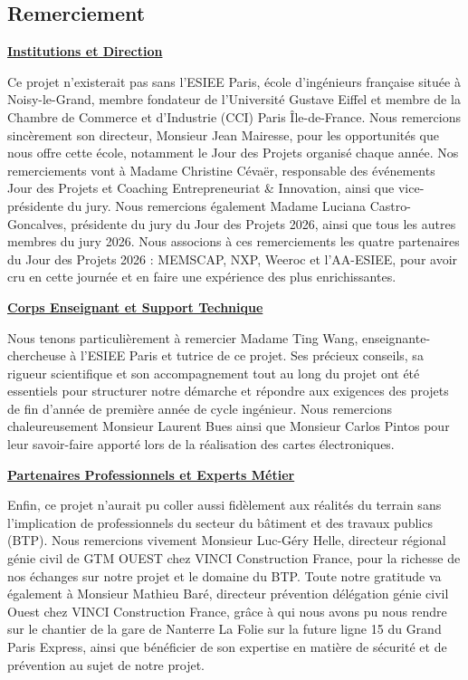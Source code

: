 \subsection{Remerciement}

\uline{\textbf{Institutions et Direction}}

Ce projet n'existerait pas sans l'ESIEE Paris, école d'ingénieurs française située à Noisy-le-Grand, membre fondateur de l'Université Gustave Eiffel et membre de la Chambre de Commerce et d'Industrie (CCI) Paris Île-de-France. Nous remercions sincèrement son directeur, Monsieur Jean Mairesse, pour les opportunités que nous offre cette école, notamment le Jour des Projets organisé chaque année.
Nos remerciements vont à Madame Christine Cévaër, responsable des événements Jour des Projets et Coaching Entrepreneuriat \& Innovation, ainsi que vice-présidente du jury. 
Nous remercions également Madame Luciana Castro-Goncalves, présidente du jury du Jour des Projets 2026, ainsi que tous les autres membres du jury 2026. 
Nous associons à ces remerciements les quatre partenaires du Jour des Projets 2026 : MEMSCAP, NXP, Weeroc et l'AA-ESIEE, pour avoir cru en cette journée et en faire une expérience des plus enrichissantes.

\bigskip

\uline{\textbf{Corps Enseignant et Support Technique}}

Nous tenons particulièrement à remercier Madame Ting Wang, enseignante-chercheuse à l'ESIEE Paris et tutrice de ce projet. Ses précieux conseils, sa rigueur scientifique et son accompagnement tout au long du projet ont été essentiels pour structurer notre démarche et répondre aux exigences des projets de fin d'année de première année de cycle ingénieur.
Nous remercions chaleureusement Monsieur Laurent Bues ainsi que Monsieur Carlos Pintos pour leur savoir-faire apporté lors de la réalisation des cartes électroniques.

\bigskip

\uline{\textbf{Partenaires Professionnels et Experts Métier}}

Enfin, ce projet n'aurait pu coller aussi fidèlement aux réalités du terrain sans l'implication de professionnels du secteur du bâtiment et des travaux publics (BTP).
Nous remercions vivement Monsieur Luc-Géry Helle, directeur régional génie civil de GTM OUEST chez VINCI Construction France, pour la richesse de nos échanges sur notre projet et le domaine du BTP. 
Toute notre gratitude va également à Monsieur Mathieu Baré, directeur prévention délégation génie civil Ouest chez VINCI Construction France, grâce à qui nous avons pu nous rendre sur le chantier de la gare de Nanterre La Folie sur la future ligne 15 du Grand Paris Express, ainsi que bénéficier de son expertise en matière de sécurité et de prévention au sujet de notre projet.


